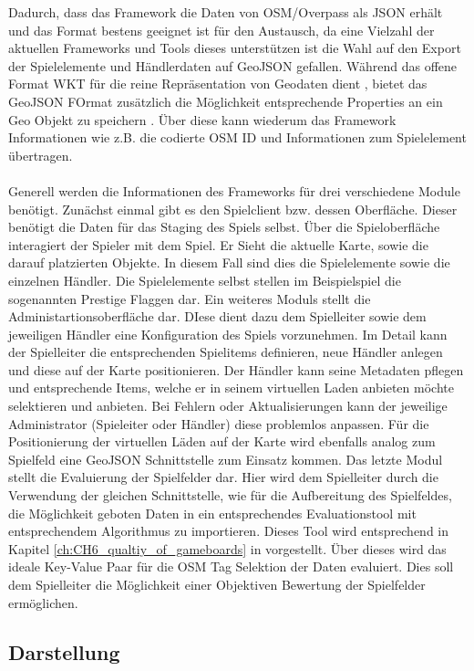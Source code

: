 Dadurch, dass das Framework die Daten von OSM/Overpass als JSON erhält und das Format bestens geeignet ist für den Austausch, da eine Vielzahl der aktuellen Frameworks und Tools dieses unterstützen ist die Wahl auf den Export der Spielelemente und Händlerdaten auf GeoJSON gefallen. Während das offene Format WKT für die reine Repräsentation von Geodaten dient \cite{Stolze.2003}, bietet das GeoJSON FOrmat zusätzlich die Möglichkeit entsprechende Properties an ein Geo Objekt zu speichern \cite{Butler.2008}. Über diese kann wiederum das Framework Informationen wie z.B. die codierte OSM ID und Informationen zum Spielelement übertragen.
\\\\
Generell werden die Informationen des Frameworks für drei verschiedene Module benötigt.
Zunächst einmal gibt es den Spielclient bzw. dessen Oberfläche. Dieser benötigt die Daten für das Staging des Spiels selbst.
Über die Spieloberfläche interagiert der Spieler mit dem Spiel. Er Sieht die aktuelle Karte, sowie die darauf platzierten Objekte. In diesem Fall sind dies die Spielelemente sowie die einzelnen Händler. Die Spielelemente selbst stellen im Beispielspiel die sogenannten Prestige Flaggen dar.
Ein weiteres Moduls stellt die Administartionsoberfläche dar. DIese dient dazu dem Spielleiter sowie dem jeweiligen Händler eine Konfiguration des Spiels vorzunehmen. Im Detail kann der Spielleiter die entsprechenden Spielitems definieren, neue Händler anlegen und diese auf der Karte positionieren. Der Händler kann seine Metadaten pflegen und entsprechende Items, welche er in seinem virtuellen Laden anbieten möchte selektieren und anbieten. Bei Fehlern oder Aktualisierungen kann der jeweilige Administrator (Spieleiter oder Händler) diese problemlos anpassen. Für die Positionierung der virtuellen Läden auf der Karte wird ebenfalls analog zum Spielfeld eine GeoJSON Schnittstelle zum Einsatz kommen.
Das letzte Modul stellt die Evaluierung der Spielfelder dar. Hier wird dem Spielleiter durch die Verwendung der gleichen Schnittstelle, wie für die Aufbereitung des Spielfeldes, die Möglichkeit geboten Daten in ein entsprechendes Evaluationstool mit entsprechendem Algorithmus  zu importieren. Dieses Tool wird entsprechend in Kapitel \ref{ch:CH6_qualtiy_of_gameboards} in vorgestellt. Über dieses wird das ideale Key-Value Paar für die OSM Tag Selektion der Daten evaluiert. Dies soll dem Spielleiter die Möglichkeit einer Objektiven Bewertung der Spielfelder ermöglichen.

\subsection*{Darstellung}

